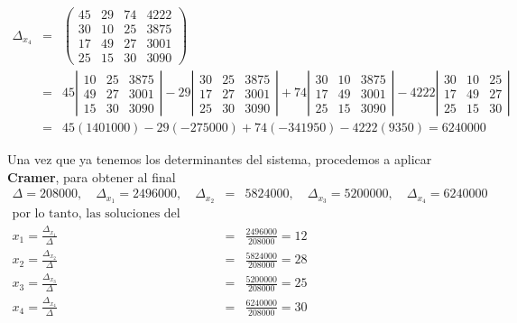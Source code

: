 \documentclass[12pt, landscape]{article}
\begin{document}
	\begin{eqnarray*}
		\Delta_{x_4} &=& \left(\begin{array}{rrrr}
							45 & 29 & 74 & 4222 \\
							30 & 10 & 25 & 3875 \\
							17 & 49 & 27 & 3001 \\
							25 & 15 & 30 & 3090
						\end{array}\right)  \\
					&=& 45 \left|\begin{array}{rrr}
						10 & 25 & 3875 \\
						49 & 27 & 3001 \\
						15 & 30 & 3090
					\end{array}\right| 
					-29 \left|\begin{array}{rrr}
						30 & 25 & 3875 \\
						17 & 27 & 3001 \\
						25 & 30 & 3090
					\end{array}\right| 
					+74 \left|\begin{array}{rrr}
						30 & 10 & 3875 \\
						17 & 49 & 3001 \\
						25 & 15 & 3090
					\end{array}\right| 
					-4222 \left|\begin{array}{rrr}
						30 & 10 & 25 \\
						17 & 49 & 27 \\
						25 & 15 & 30
					\end{array}\right|  \\
					&=& 45(1401000) -29(-275000) +74(-341950) -4222(9350) = 6240000
	\end{eqnarray*}
	
	Una vez que ya tenemos los determinantes del sistema, procedemos a aplicar \textbf{Cramer}, para obtener al final
	\begin{eqnarray*}
		\Delta = 208000,\quad \Delta_{x_1} = 2496000,\quad \Delta_{x_2} &=& 5824000,\quad \Delta_{x_3} = 5200000,\quad \Delta_{x_4} = 6240000 \\
		\text{por lo tanto, las soluciones del sistema son }&&\\
		x_1 = \frac{\Delta_{x_1}}{\Delta} &=& \frac{2496000}{208000} = 12 \\
		x_2 = \frac{\Delta_{x_2}}{\Delta} &=& \frac{5824000}{208000} = 28 \\
		x_3 = \frac{\Delta_{x_3}}{\Delta} &=& \frac{5200000}{208000} = 25 \\
		x_4 = \frac{\Delta_{x_4}}{\Delta} &=& \frac{6240000}{208000} = 30 \\
	\end{eqnarray*}
	
\end{document}

